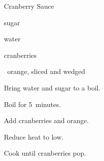 \begin{recipe}{Cranberry Sauce}{}{}

\begin{ingredients}
\item {} sugar
\item {} water
\item {} cranberries
\item \half~orange, sliced and wedged
\end{ingredients}

\begin{directions}
\item Bring water and sugar to a boil.
\item Boil for 5~minutes.
\item Add cranberries and orange.
\item Reduce heat to low.
\item Cook until cranberries pop.
\end{directions}

\end{recipe}
